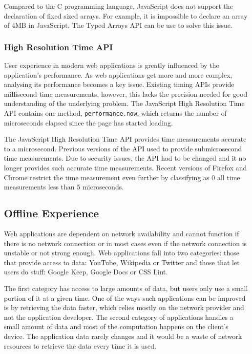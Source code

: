 \documentclass[10pt,a4paper,twoside]{book}
\begin{document}
Compared to the C programming language, JavaScript does not support the declaration of fixed sized arrays. For example, it is impossible to declare an array of 4MB in JavaScript. The Typed Arrays API can be use to solve this issue.

\subsubsection{High Resolution Time API}

User experience in modern web applications is greatly influenced by the application's performance. As web applications get more and more complex, analysing its performance becomes a key issue. Existing timing APIs provide millisecond time measurements; however, this lacks the precision needed for good understanding of the underlying problem. The JavaScript High Resolution Time API contains one method, \texttt{performance.now}, which returns the number of microseconds elapsed since the page has started loading. 

The JavaScript High Resolution Time API \cite{jshighresolutiontimeapi} provides time measurements accurate to a microsecond. Previous versions of the API used to provide submicrosecond time measurements. Due to security issues, the API had to be changed and it no longer provides such accurate time measurements. Recent versions of Firefox and Chrome restrict the time measurement even further by classifying as 0 all time measurements less than 5 microseconds.

\subsection{Offline Experience}
Web applications are dependent on network availability and cannot function if there is no network connection or in most cases even if the network connection is unstable or not strong enough. Web applications fall into two categories: those that provide access to data: YouTube, Wikipedia or Twitter and those that let users do stuff: Google Keep, Google Docs or CSS Lint.

The first category has access to large amounts of data, but users only use a small portion of it at a given time. One of the ways such applications can be improved is by retrieving the data faster, which relies mostly on the network provider and not the application developer. The second category of applications handles a small amount of data and most of the computation happens on the client's device. 	The application data rarely changes and it would be a waste of network resources to retrieve the data every time it is used. 
\end{document}
